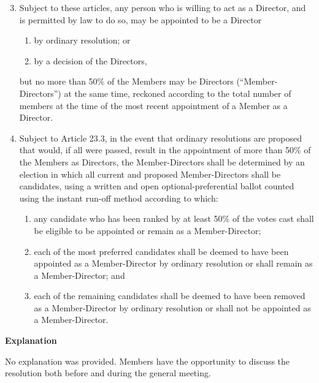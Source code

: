 \documentclass[a4paper,10pt]{article}
\begin{document}
\begin{framed}
  \begin{enumerate}
    \setcounter{enumi}{2}
    \renewcommand{\labelenumi}{23.\arabic{enumi}}
    \item Subject to these articles, any person who is willing to act as a Director, and is permitted by law to do so, may be appointed to be a Director
    \begin{enumerate}
      \renewcommand{\labelenumii}{(\alph{enumii})}
      \item by ordinary resolution; or
      \item by a decision of the Directors,
    \end{enumerate}
    but no more than 50\% of the Members may be Directors (``Member-Directors'') at the same time, reckoned according to the total number of members at the time of the most recent appointment of a Member as a Director.
    \item Subject to Article 23.3, in the event that ordinary resolutions are proposed that would, if all were passed, result in the appointment of more than 50\% of the Members as Directors, the Member-Directors shall be determined by an election in which all current and proposed Member-Directors shall be candidates, using a written and open optional-preferential ballot counted using the instant run-off method according to which:
    \begin{enumerate}
      \renewcommand{\labelenumii}{(\alph{enumii})}
      \item any candidate who has been ranked by at least 50\% of the votes cast shall be eligible to be appointed or remain as a Member-Director;
      \item each of the most preferred candidates shall be deemed to have been appointed as a Member-Director by ordinary resolution or shall remain as a Member-Director; and
      \item each of the remaining candidates shall be deemed to have been removed as a Member-Director by ordinary resolution or shall not be appointed as a Member-Director.
    \end{enumerate}
 \end{enumerate}
\end{framed}

\textbf{Explanation}

No explanation was provided. Members have the opportunity to discuss the resolution both before and during the general meeting.
\end{document}
